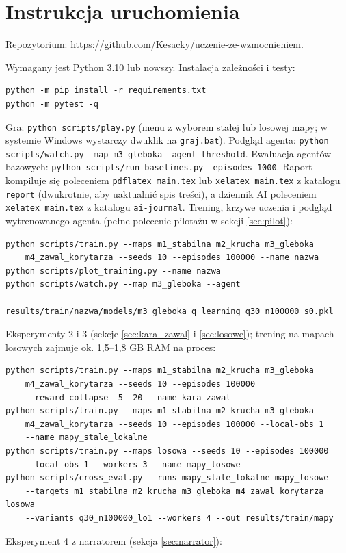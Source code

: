 \documentclass[11pt,a4paper]{article}
\begin{document}
\section{Instrukcja uruchomienia}
Repozytorium:
\url{https://github.com/Kesacky/uczenie-ze-wzmocnieniem}.

Wymagany jest Python 3.10 lub nowszy. Instalacja zależności i testy:
\begin{verbatim}
python -m pip install -r requirements.txt
python -m pytest -q
\end{verbatim}
Gra: \texttt{python scripts/play.py} (menu z wyborem stałej lub losowej mapy;
w systemie Windows wystarczy dwuklik na \texttt{graj.bat}). Podgląd agenta:
\texttt{python scripts/watch.py --map m3\_gleboka --agent threshold}.
Ewaluacja agentów bazowych:
\texttt{python scripts/run\_baselines.py --episodes 1000}.
Raport kompiluje się poleceniem \texttt{pdflatex main.tex} lub
\texttt{xelatex main.tex} z katalogu \texttt{report} (dwukrotnie, aby
uaktualnić spis treści), a dziennik AI poleceniem \texttt{xelatex main.tex}
z katalogu \texttt{ai-journal}.
Trening, krzywe uczenia i podgląd wytrenowanego agenta (pełne polecenie
pilotażu w sekcji \ref{sec:pilot}):
\begin{verbatim}
python scripts/train.py --maps m1_stabilna m2_krucha m3_gleboka
    m4_zawal_korytarza --seeds 10 --episodes 100000 --name nazwa
python scripts/plot_training.py --name nazwa
python scripts/watch.py --map m3_gleboka --agent
    results/train/nazwa/models/m3_gleboka_q_learning_q30_n100000_s0.pkl
\end{verbatim}
Eksperymenty 2 i 3 (sekcje \ref{sec:kara_zawal} i \ref{sec:losowe}); trening na
mapach losowych zajmuje ok. 1,5--1,8 GB RAM na proces:
\begin{verbatim}
python scripts/train.py --maps m1_stabilna m2_krucha m3_gleboka
    m4_zawal_korytarza --seeds 10 --episodes 100000
    --reward-collapse -5 -20 --name kara_zawal
python scripts/train.py --maps m1_stabilna m2_krucha m3_gleboka
    m4_zawal_korytarza --seeds 10 --episodes 100000 --local-obs 1
    --name mapy_stale_lokalne
python scripts/train.py --maps losowa --seeds 10 --episodes 100000
    --local-obs 1 --workers 3 --name mapy_losowe
python scripts/cross_eval.py --runs mapy_stale_lokalne mapy_losowe
    --targets m1_stabilna m2_krucha m3_gleboka m4_zawal_korytarza losowa
    --variants q30_n100000_lo1 --workers 4 --out results/train/mapy
\end{verbatim}
Eksperyment 4 z narratorem (sekcja \ref{sec:narrator}):
\end{document}
